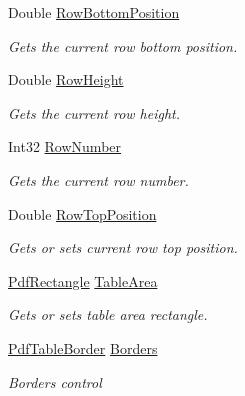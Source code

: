 \begin{DoxyCompactItemize}
Double \hyperlink{class_pdf_file_writer_1_1_pdf_table_a1373238391e02c813a3c2e31295a12bb}{Row\+Bottom\+Position}
\begin{DoxyCompactList}\small\item\em Gets the current row bottom position. \end{DoxyCompactList}\item 
Double \hyperlink{class_pdf_file_writer_1_1_pdf_table_aff27db154d5cf0f51b7dbee0c0339d29}{Row\+Height}
\begin{DoxyCompactList}\small\item\em Gets the current row height. \end{DoxyCompactList}\item 
Int32 \hyperlink{class_pdf_file_writer_1_1_pdf_table_ab6a1a8de50542d8e9ae8b23e1514fdfe}{Row\+Number}
\begin{DoxyCompactList}\small\item\em Gets the current row number. \end{DoxyCompactList}\item 
Double \hyperlink{class_pdf_file_writer_1_1_pdf_table_aac22bde61a2ed6990ffcb1bf06cb3ee6}{Row\+Top\+Position}
\begin{DoxyCompactList}\small\item\em Gets or sets current row top position. \end{DoxyCompactList}\item 
\hyperlink{class_pdf_file_writer_1_1_pdf_rectangle}{Pdf\+Rectangle} \hyperlink{class_pdf_file_writer_1_1_pdf_table_a876893813bf86ae113c6dc4a0effcf51}{Table\+Area}
\begin{DoxyCompactList}\small\item\em Gets or sets table area rectangle. \end{DoxyCompactList}\item 
\hyperlink{class_pdf_file_writer_1_1_pdf_table_border}{Pdf\+Table\+Border} \hyperlink{class_pdf_file_writer_1_1_pdf_table_abfa9274eb1da0c1e6de0d750502535b9}{Borders}
\begin{DoxyCompactList}\small\item\em Borders control \end{DoxyCompactList}\end{DoxyCompactItemize}
